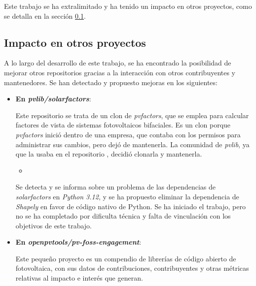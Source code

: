 Este trabajo se ha extralimitado y ha tenido un impacto en otros proyectos, como se detalla en la sección \ref{sssct:impacto:otrosproyectos}.


\subsection{Impacto en otros proyectos} \label{sssct:impacto:otrosproyectos}

A lo largo del desarrollo de este trabajo, se ha encontrado la posibilidad de mejorar otros repositorios gracias a la interacción con otros contribuyentes y mantenedores. Se han detectado y propuesto mejoras en los siguientes:

\begin{itemize}

    \item \textbf{En \textit{pvlib/solarfactors}}:

          Este \gls{repositorio} se trata de un clon de \textit{pvfactors}, que se emplea para calcular factores de vista de sistemas fotovoltaicos bifaciales. Es un clon porque \textit{pvfactors} inició dentro de una empresa, que contaba con los permisos para administrar sus cambios, pero dejó de mantenerla. La comunidad de \textit{pvlib}, ya que la usaba en el repositorio \pvlibpy{}, decidió clonarla y mantenerla.

          \begin{itemize}
              \item {}
          \end{itemize}

          Se detecta y se informa sobre un problema de las dependencias de \textit{solarfactors} en \textit{Python 3.12}, y se ha propuesto eliminar la dependencia de \textit{Shapely} en favor de código nativo de Python. Se ha iniciado el trabajo, pero no se ha completado por dificulta técnica y falta de vinculación con los objetivos de este trabajo.

    \item \textbf{En \textit{openpvtools/pv-foss-engagement}}:

          Este pequeño proyecto es un compendio de librerías de código abierto de fotovoltaica, con sus datos de contribuciones, contribuyentes y otras métricas relativas al impacto e interés que generan.


\end{itemize}
